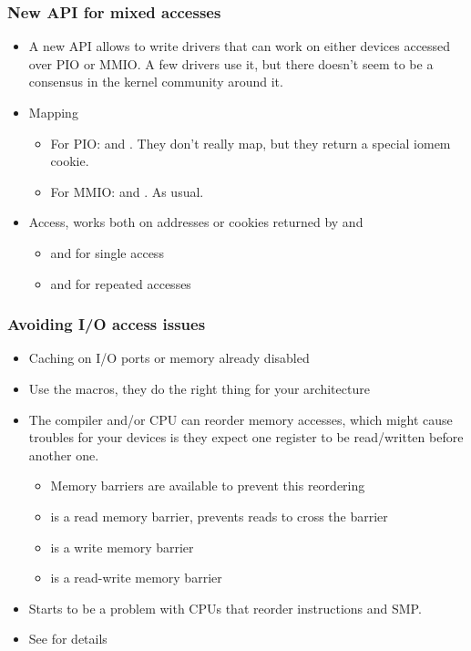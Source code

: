 \begin{frame}
  \frametitle{New API for mixed accesses}
  \begin{itemize}
  \item A new API allows to write drivers that can work on either
    devices accessed over PIO or MMIO. A few drivers use it, but there
    doesn't seem to be a consensus in the kernel community around it.
  \item Mapping
    \begin{itemize}
    \item For PIO:  and . They
      don't really map, but they return a special iomem cookie.
    \item For MMIO:  and . As usual.
    \end{itemize}
  \item Access, works both on addresses or cookies returned by
     and 
    \begin{itemize}
    \item {} and  for
      single access
    \item {} and
       for repeated accesses
    \end{itemize}
  \end{itemize}
\end{frame}

\begin{frame}
  \frametitle{Avoiding I/O access issues}
  \begin{itemize}
  \item Caching on I/O ports or memory already disabled
  \item Use the macros, they do the right thing for your architecture
  \item The compiler and/or CPU can reorder memory accesses, which
    might cause troubles for your devices is they expect one register
    to be read/written before another one.
    \begin{itemize}
    \item Memory barriers are available to prevent this reordering
    \item {} is a read memory barrier, prevents reads to
      cross the barrier
    \item {} is a write memory barrier
    \item {} is a read-write memory barrier
    \end{itemize}
  \item Starts to be a problem with CPUs that reorder instructions and
    SMP.
  \item See  for details
  \end{itemize}
\end{frame}

